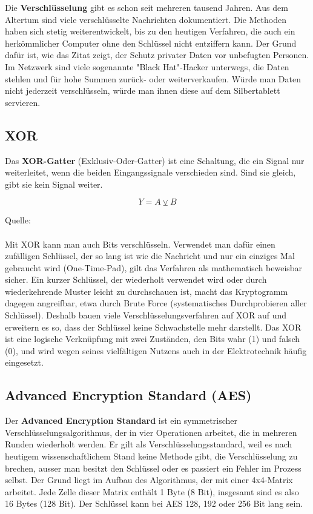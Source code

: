 Die \textbf{Verschlüsselung} gibt es schon seit mehreren tausend Jahren. Aus dem Altertum sind viele verschlüsselte Nachrichten dokumentiert.\citep{GeschichteKryptographie2026} Die Methoden haben sich stetig weiterentwickelt, bis zu den heutigen Verfahren, die auch ein herkömmlicher Computer ohne den Schlüssel nicht entziffern kann. Der Grund dafür ist, wie das Zitat zeigt, der Schutz privater Daten vor unbefugten Personen. Im Netzwerk sind viele sogenannte "Black Hat"-Hacker unterwegs, die Daten stehlen und für hohe Summen zurück- oder weiterverkaufen. Würde man Daten nicht jederzeit verschlüsseln, würde man ihnen diese auf dem Silbertablett servieren.

\subsection{XOR}

Das \textbf{XOR-Gatter} (Exklusiv-Oder-Gatter) ist eine Schaltung, die ein Signal nur weiterleitet, wenn die beiden Eingangssignale verschieden sind. Sind sie gleich, gibt sie kein Signal weiter.

\[Y=A\veebar B\]

Quelle: \cite{exklusiv_oder_gatter_2026}\\\\

Mit XOR kann man auch Bits verschlüsseln. Verwendet man dafür einen zufälligen Schlüssel, der so lang ist wie die Nachricht und nur ein einziges Mal gebraucht wird (One-Time-Pad), gilt das Verfahren als mathematisch beweisbar sicher. Ein kurzer Schlüssel, der wiederholt verwendet wird oder durch wiederkehrende Muster leicht zu durchschauen ist, macht das Kryptogramm dagegen angreifbar, etwa durch Brute Force (systematisches Durchprobieren aller Schlüssel). Deshalb bauen viele Verschlüsselungsverfahren auf XOR auf und erweitern es so, dass der Schlüssel keine Schwachstelle mehr darstellt. Das XOR ist eine logische Verknüpfung mit zwei Zuständen, den Bits wahr (1) und falsch (0), und wird wegen seines vielfältigen Nutzens auch in der Elektrotechnik häufig eingesetzt.

\subsection{Advanced Encryption Standard (AES)}

Der \textbf{Advanced Encryption Standard} ist ein symmetrischer Verschlüsselungsalgorithmus, der in vier Operationen arbeitet, die in mehreren Runden wiederholt werden.\citep{AdvancedEncryptionStandard2026,computerphileAESExplainedAdvanced2019} Er gilt als Verschlüsselungsstandard, weil es nach heutigem wissenschaftlichem Stand keine Methode gibt, die Verschlüsselung zu brechen, ausser man besitzt den Schlüssel oder es passiert ein Fehler im Prozess selbst. Der Grund liegt im Aufbau des Algorithmus, der mit einer 4x4-Matrix arbeitet. Jede Zelle dieser Matrix enthält 1 Byte (8 Bit), insgesamt sind es also 16 Bytes (128 Bit). Der Schlüssel kann bei AES 128, 192 oder 256 Bit lang sein.\\\\

